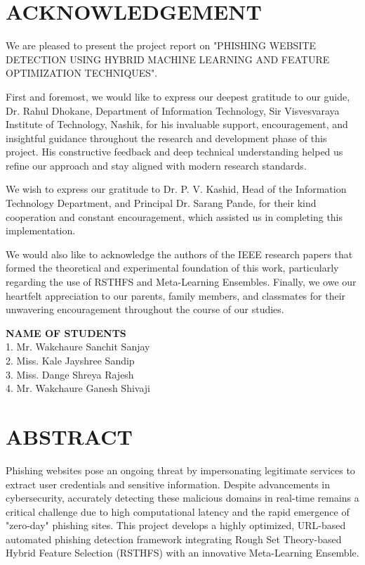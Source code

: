 \documentclass[12pt]{report}
\begin{document}
\onehalfspacing






\chapter*{ACKNOWLEDGEMENT}
We are pleased to present the project report on "PHISHING WEBSITE DETECTION USING HYBRID MACHINE LEARNING AND FEATURE OPTIMIZATION TECHNIQUES".

First and foremost, we would like to express our deepest gratitude to our guide, Dr. Rahul Dhokane, Department of Information Technology, Sir Visvesvaraya Institute of Technology, Nashik, for his invaluable support, encouragement, and insightful guidance throughout the research and development phase of this project. His constructive feedback and deep technical understanding helped us refine our approach and stay aligned with modern research standards.

We wish to express our gratitude to Dr. P. V. Kashid, Head of the Information Technology Department, and Principal Dr. Sarang Pande, for their kind cooperation and constant encouragement, which assisted us in completing this implementation.

We would also like to acknowledge the authors of the IEEE research papers that formed the theoretical and experimental foundation of this work, particularly regarding the use of RSTHFS and Meta-Learning Ensembles. Finally, we owe our heartfelt appreciation to our parents, family members, and classmates for their unwavering encouragement throughout the course of our studies.

\vspace{1cm}
\begin{flushright}
\textbf{NAME OF STUDENTS} \\
1. Mr. Wakchaure Sanchit Sanjay \\
2. Miss. Kale Jayshree Sandip \\
3. Miss. Dange Shreya Rajesh \\
4. Mr. Wakchaure Ganesh Shivaji
\end{flushright}

\chapter*{ABSTRACT}
Phishing websites pose an ongoing threat by impersonating legitimate services to extract user credentials and sensitive information. Despite advancements in cybersecurity, accurately detecting these malicious domains in real-time remains a critical challenge due to high computational latency and the rapid emergence of "zero-day" phishing sites. This project develops a highly optimized, URL-based automated phishing detection framework integrating Rough Set Theory-based Hybrid Feature Selection (RSTHFS) with an innovative Meta-Learning Ensemble.
\end{document}
